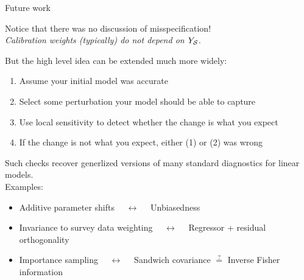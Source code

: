 \begin{frame}{Future work}

Notice that there was no discussion of misspecification!\\[1em]

\emph{Calibration weights (typically) do not depend on $Y_{\mathcal{S}}$.}

\pause

\vspace{2em}
But the high level idea can be extended much more widely:
%
\begin{enumerate}
\item Assume your initial model was accurate
\item Select some perturbation your model should be able to capture
\item Use local sensitivity to detect whether the change is what you expect
\item If the change is not what you expect, either (1) or (2) was wrong
\end{enumerate}
%

\pause

\vspace{2em}
Such checks recover generlized versions of many standard diagnostics for linear models.\\[1em]
Examples:
\begin{itemize}
\item Additive parameter shifts $\quad\leftrightarrow\quad$ Unbiasedness
\item Invariance to survey data weighting $\quad\leftrightarrow\quad$ Regressor + residual orthogonality
\item Importance sampling $\quad\leftrightarrow\quad$ Sandwich covariance $\overset{?}{=}$ Inverse Fisher information
\end{itemize}

\vspace{2em}


\end{frame}




